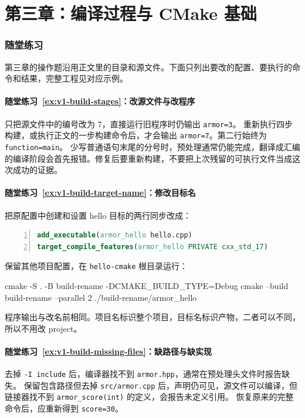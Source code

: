 \section*{第三章：编译过程与 CMake 基础}
{}
\subsubsection*{随堂练习}
第三章的操作题沿用正文里的目录和源文件。下面只列出要改的配置、要执行的命令和结果，完整工程见对应示例。

\paragraph*{随堂练习~\ref{ex:v1-build-stages}：改源文件与改程序}
\begin{solution}
只把源文件中的编号改为 7，直接运行旧程序时仍输出 \texttt{armor=3}。
重新执行四步构建，或执行正文的一步构建命令后，才会输出 \texttt{armor=7}。第二行始终为 \texttt{function=main}。
少写普通语句末尾的分号时，预处理通常仍能完成，翻译成汇编的编译阶段会首先报错。修复后要重新构建，不要把上次残留的可执行文件当成这次成功的证据。
\end{solution}

\paragraph*{随堂练习~\ref{ex:v1-build-target-name}：修改目标名}
\begin{solution}
把原配置中创建和设置 hello 目标的两行同步改成：
\begin{lstlisting}[language=cmake,frame=single,numbers=left]
add_executable(armor_hello hello.cpp)
target_compile_features(armor_hello PRIVATE cxx_std_17)
\end{lstlisting}
保留其他项目配置，在 \texttt{hello-cmake} 根目录运行：
\begin{tbash}
cmake -S . -B build-rename -DCMAKE_BUILD_TYPE=Debug
cmake --build build-rename --parallel 2
./build-rename/armor_hello
\end{tbash}
程序输出与改名前相同。项目名标识整个项目，目标名标识产物，二者可以不同，所以不用改 project。
\end{solution}

\paragraph*{随堂练习~\ref{ex:v1-build-missing-files}：缺路径与缺实现}
\begin{solution}
去掉 \texttt{-I include} 后，编译器找不到 \texttt{armor.hpp}，通常在预处理头文件时报告缺失。
保留包含路径但去掉 \texttt{src/armor.cpp} 后，声明仍可见，源文件可以编译，但链接器找不到 \texttt{armor\_score(int)} 的定义，会报告未定义引用。
恢复原来的完整命令后，应重新得到 \texttt{score=30}。
\end{solution}

